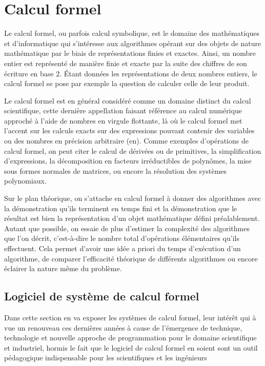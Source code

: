 \section{Calcul formel}
Le calcul formel, ou parfois calcul symbolique, est le domaine des mathématiques et d'informatique qui s'intéresse aux algorithmes opérant sur des objets de nature mathématique par le biais de représentations finies et exactes. Ainsi, un nombre entier est représenté de manière finie et exacte par la suite des chiffres de son écriture en base $2$. Étant données les représentations de deux nombres entiers, le calcul formel se pose par exemple la question de calculer celle de leur produit.

Le calcul formel est en général considéré comme un domaine distinct du calcul scientifique, cette dernière appellation faisant référence au calcul numérique approché à l'aide de nombres en virgule flottante, là où le calcul formel met l'accent sur les calculs exacts sur des expressions pouvant contenir des variables ou des nombres en précision arbitraire (en). Comme exemples d'opérations de calcul formel, on peut citer le calcul de dérivées ou de primitives, la simplification d'expressions, la décomposition en facteurs irréductibles de polynômes, la mise sous formes normales de matrices, ou encore la résolution des systèmes polynomiaux.

Sur le plan théorique, on s'attache en calcul formel à donner des algorithmes avec la démonstration qu'ils terminent en temps fini et la démonstration que le résultat est bien la représentation d'un objet mathématique défini préalablement. Autant que possible, on essaie de plus d'estimer la complexité des algorithmes que l'on décrit, c'est-à-dire le nombre total d'opérations élémentaires qu'ils effectuent. Cela permet d'avoir une idée a priori du temps d'exécution d'un algorithme, de comparer l'efficacité théorique de différents algorithmes ou encore éclairer la nature même du problème.
\subsection{Logiciel de système de calcul formel}
Dans cette section en va exposer les systèmes de calcul formel, leur intérêt qui à vue un renouveau ces dernières années à cause de l'émergence de technique, technologie et nouvelle approche de programmation pour le domaine scientifique et industriel, hormis le fait que le logiciel de calcul formel en soient sont un outil pédagogique 
indispensable pour les scientifiques et les ingénieurs

